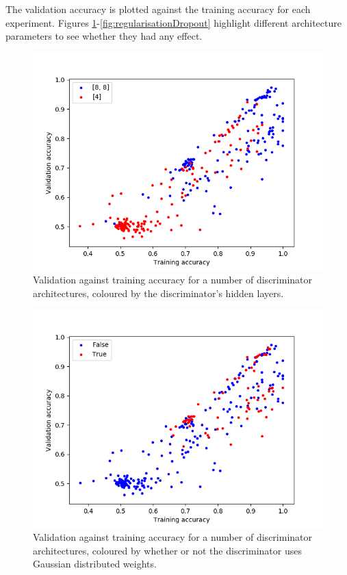 \documentclass[a4paper]{article}
\begin{document}
The validation accuracy is plotted against the training accuracy for each experiment.
Figures \ref{fig:regularisationNetworkShape}-\ref{fig:regularisationDropout} highlight different architecture parameters to see whether they had any effect.

\begin{figure}
  \centering
  \includegraphics[scale=0.75]{../../figures/circlesobjective/validation_vs_training_network_shape.png}
  \caption{Validation against training accuracy for a number of discriminator architectures,
    coloured by the discriminator's hidden layers.}
  \label{fig:regularisationNetworkShape}
  \end{figure}

\begin{figure}
  \centering
  \includegraphics[scale=0.75]{../../figures/circlesobjective/validation_vs_training_bayesian_network.png}
  \caption{Validation against training accuracy for a number of discriminator architectures,
    coloured by whether or not the discriminator uses Gaussian distributed weights.}
  \label{fig:regularisationBayesianNetwork}
  \end{figure}
\end{document}
